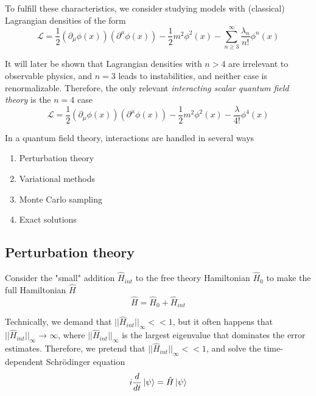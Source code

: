 \noindent To fulfill these characteristics, we consider studying models with (classical) Lagrangian densities of the form
\begin{equation}
\mathcal{L} = \frac{1}{2} (\partial_\mu \phi(x))(\partial^\mu \phi(x)) - \frac{1}{2}m^2\phi^2(x) - \sum_{n\ge 3}^\infty \frac{\lambda_n}{n!} \phi^n(x)
\end{equation}

\noindent It will later be shown that Lagrangian densities with $n>4$ are irrelevant to observable physics, and $n=3$ leads to instabilities, and neither case is renormalizable. Therefore, the only relevant \textit{interacting scalar quantum field theory} is the $n=4$ case
\begin{equation}
\mathcal{L} = \frac{1}{2} (\partial_\mu \phi(x))(\partial^\mu \phi(x)) - \frac{1}{2}m^2\phi^2(x) - \frac{\lambda}{4!} \phi^4(x)
\end{equation}

\noindent In a quantum field theory, interactions are handled in several ways
\begin{enumerate}
\item Perturbation theory
\item Variational methods
\item Monte Carlo sampling
\item Exact solutions
\end{enumerate}

\subsection*{Perturbation theory}

\noindent Consider the "small" addition $\hat{H}_{int}$ to the free theory Hamiltonian $\hat{H}_0$ to make the full Hamiltonian $\hat{H}$
\begin{equation}
\hat{H} = \hat{H}_0 + \hat{H}_{int}
\end{equation}

\noindent Technically, we demand that $||\hat{H}_{int}||_\infty << 1$, but it often happens that $||\hat{H}_{int}||_\infty \rightarrow \infty$, where $||\hat{H}_{int}||_\infty$ is the largest eigenvalue that dominates the error estimates. Therefore, we pretend that $||\hat{H}_{int}||_\infty << 1$, and solve the time-dependent Schr\"odinger equation 
\begin{equation}
i\frac{d}{dt}\ket{\psi} = \hat{H}\ket{\psi}
\end{equation}

